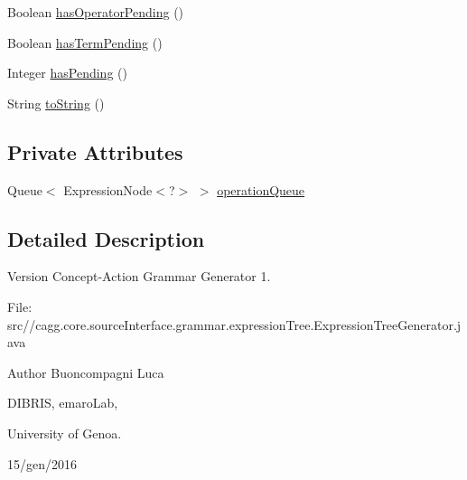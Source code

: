 \begin{DoxyCompactItemize}
\item 
Boolean \hyperlink{classit_1_1emarolab_1_1cagg_1_1core_1_1language_1_1syntax_1_1expressionTree_1_1ExpressionTreeGenerator_1_1ExpressionQueues_a5ff877a384ed748289205e308ff44c86}{has\-Operator\-Pending} ()
\item 
Boolean \hyperlink{classit_1_1emarolab_1_1cagg_1_1core_1_1language_1_1syntax_1_1expressionTree_1_1ExpressionTreeGenerator_1_1ExpressionQueues_a2c9534c7a8be5f7520995da947185db5}{has\-Term\-Pending} ()
\item 
Integer \hyperlink{classit_1_1emarolab_1_1cagg_1_1core_1_1language_1_1syntax_1_1expressionTree_1_1ExpressionTreeGenerator_1_1ExpressionQueues_a3e49595a6682e2ca900f3813c126483d}{has\-Pending} ()
\item 
String \hyperlink{classit_1_1emarolab_1_1cagg_1_1core_1_1language_1_1syntax_1_1expressionTree_1_1ExpressionTreeGenerator_1_1ExpressionQueues_add7a044ba23485dad38053869fd46d85}{to\-String} ()
\end{DoxyCompactItemize}
\subsection*{Private Attributes}
\begin{DoxyCompactItemize}
\item 
Queue$<$ Expression\-Node$<$?$>$ $>$ \hyperlink{classit_1_1emarolab_1_1cagg_1_1core_1_1language_1_1syntax_1_1expressionTree_1_1ExpressionTreeGenerator_1_1ExpressionQueues_a1d79417f8bae0ed4313b55f48987affa}{operation\-Queue}
\end{DoxyCompactItemize}


\subsection{Detailed Description}
\begin{DoxyVersion}{Version}
Concept-\/\-Action Grammar Generator 1. \par
 File\-: src//cagg.core.\-source\-Interface.\-grammar.\-expression\-Tree.\-Expression\-Tree\-Generator.\-java \par

\end{DoxyVersion}
\begin{DoxyAuthor}{Author}
Buoncompagni Luca \par
 D\-I\-B\-R\-I\-S, emaro\-Lab,\par
 University of Genoa. \par
 15/gen/2016 \par

\end{DoxyAuthor}


